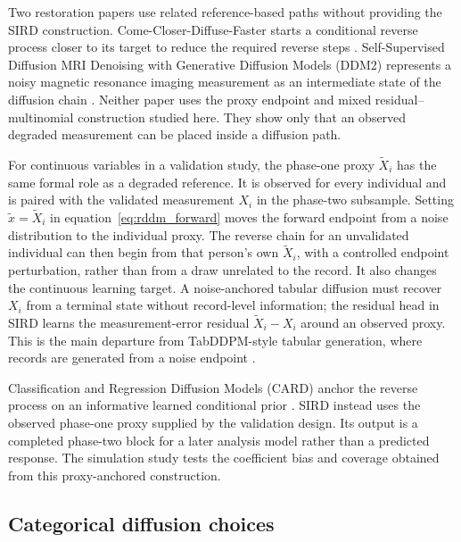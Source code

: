 Two restoration papers use related reference-based paths without providing the SIRD construction. Come-Closer-Diffuse-Faster starts a conditional reverse process closer to its target to reduce the required reverse steps \citep{chung2022come}. Self-Supervised Diffusion MRI Denoising with Generative Diffusion Models (DDM2) represents a noisy magnetic resonance imaging measurement as an intermediate state of the diffusion chain \citep{xiang2023ddm2}. Neither paper uses the proxy endpoint and mixed residual--multinomial construction studied here. They show only that an observed degraded measurement can be placed inside a diffusion path.

For continuous variables in a validation study, the phase-one proxy \(\tilde X_i\) has the same formal role as a degraded reference. It is observed for every individual and is paired with the validated measurement \(X_i\) in the phase-two subsample. Setting \(\tilde{x}=\tilde X_i\) in equation~\eqref{eq:rddm_forward} moves the forward endpoint from a noise distribution to the individual proxy. The reverse chain for an unvalidated individual can then begin from that person's own \(\tilde X_i\), with a controlled endpoint perturbation, rather than from a draw unrelated to the record. It also changes the continuous learning target. A noise-anchored tabular diffusion must recover \(X_i\) from a terminal state without record-level information; the residual head in SIRD learns the measurement-error residual \(\tilde X_i-X_i\) around an observed proxy. This is the main departure from TabDDPM-style tabular generation, where records are generated from a noise endpoint \citep{kotelnikov2023tabddpm}.

Classification and Regression Diffusion Models (CARD) anchor the reverse process on an informative learned conditional prior \citep{han2022card}. SIRD instead uses the observed phase-one proxy supplied by the validation design. Its output is a completed phase-two block for a later analysis model rather than a predicted response. The simulation study tests the coefficient bias and coverage obtained from this proxy-anchored construction.


\subsection{Categorical diffusion choices}
\label{sec:sird_multinomial}

